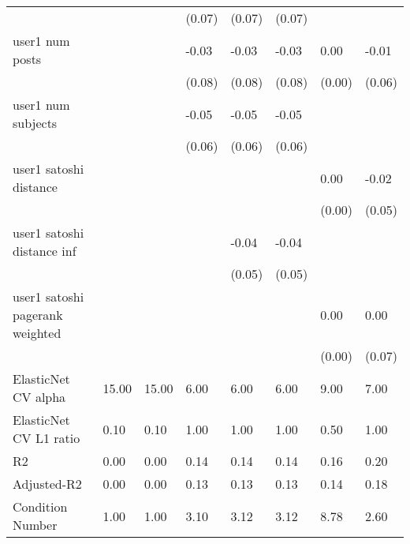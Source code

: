 \begin{table}
\begin{center}
\begin{tabular}{llllllll}
                                               &         &         & (0.07)   & (0.07)   & (0.07)   &           &          \\
user1 num posts                                &         &         & -0.03    & -0.03    & -0.03    & 0.00      & -0.01    \\
                                               &         &         & (0.08)   & (0.08)   & (0.08)   & (0.00)    & (0.06)   \\
user1 num subjects                             &         &         & -0.05    & -0.05    & -0.05    &           &          \\
                                               &         &         & (0.06)   & (0.06)   & (0.06)   &           &          \\
user1 satoshi distance                         &         &         &          &          &          & 0.00      & -0.02    \\
                                               &         &         &          &          &          & (0.00)    & (0.05)   \\
user1 satoshi distance inf                     &         &         &          & -0.04    & -0.04    &           &          \\
                                               &         &         &          & (0.05)   & (0.05)   &           &          \\
user1 satoshi pagerank weighted                &         &         &          &          &          & 0.00      & 0.00     \\
                                               &         &         &          &          &          & (0.00)    & (0.07)   \\
ElasticNet CV alpha                            & 15.00   & 15.00   & 6.00     & 6.00     & 6.00     & 9.00      & 7.00     \\
ElasticNet CV  L1 ratio                        & 0.10    & 0.10    & 1.00     & 1.00     & 1.00     & 0.50      & 1.00     \\
R2                                             & 0.00    & 0.00    & 0.14     & 0.14     & 0.14     & 0.16      & 0.20     \\
Adjusted-R2                                    & 0.00    & 0.00    & 0.13     & 0.13     & 0.13     & 0.14      & 0.18     \\
Condition Number                               & 1.00    & 1.00    & 3.10     & 3.12     & 3.12     & 8.78      & 2.60     \\

\end{tabular}
\end{center}
\end{table}
